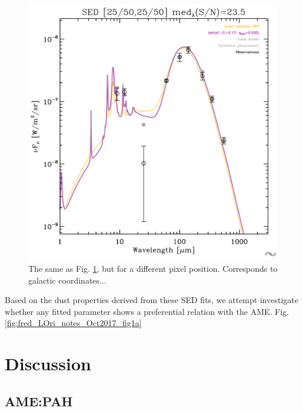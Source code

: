     \begin{figure}
      \includegraphics[width=\textwidth/2]{../Plots/ch_lori/fred_LOri_notes_Oct2017_fig1b.pdf}
      \centering
      \caption{The same as Fig. \ref{fig:fred_LOri_notes_Oct2017_fig1b}, but for a different pixel position. Corresponds to galactic coordinates...}
      \label{fig:fred_LOri_notes_Oct2017_fig1b}
    \end{figure}

    Based on the dust properties derived from these SED fits, we attempt investigate whether any fitted parameter shows a preferential relation with the AME. Fig. \ref{fig:fred_LOri_notes_Oct2017_fig1a}

  \section{Discussion}
    \subsection{AME:PAH}

